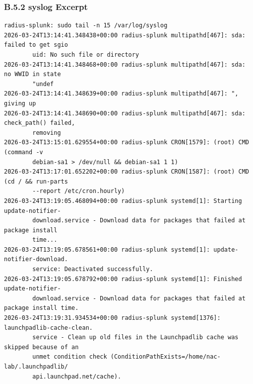 \documentclass[11pt]{article}
\begin{document}

\subsubsection{B.5.2 syslog Excerpt}
\label{sec:appendix-b-syslog-excerpt}

\begin{verbatim}
radius-splunk: sudo tail -n 15 /var/log/syslog
2026-03-24T13:14:41.348438+00:00 radius-splunk multipathd[467]: sda: failed to get sgio 
        uid: No such file or directory
2026-03-24T13:14:41.348468+00:00 radius-splunk multipathd[467]: sda: no WWID in state 
        "undef
2026-03-24T13:14:41.348639+00:00 radius-splunk multipathd[467]: ", giving up
2026-03-24T13:14:41.348690+00:00 radius-splunk multipathd[467]: sda: check_path() failed, 
        removing
2026-03-24T13:15:01.629554+00:00 radius-splunk CRON[1579]: (root) CMD (command -v 
        debian-sa1 > /dev/null && debian-sa1 1 1)
2026-03-24T13:17:01.652202+00:00 radius-splunk CRON[1587]: (root) CMD (cd / && run-parts 
        --report /etc/cron.hourly)
2026-03-24T13:19:05.468094+00:00 radius-splunk systemd[1]: Starting update-notifier-
        download.service - Download data for packages that failed at package install 
        time...
2026-03-24T13:19:05.678561+00:00 radius-splunk systemd[1]: update-notifier-download.
        service: Deactivated successfully.
2026-03-24T13:19:05.678792+00:00 radius-splunk systemd[1]: Finished update-notifier-
        download.service - Download data for packages that failed at package install time.
2026-03-24T13:19:31.934534+00:00 radius-splunk systemd[1376]: launchpadlib-cache-clean.
        service - Clean up old files in the Launchpadlib cache was skipped because of an
        unmet condition check (ConditionPathExists=/home/nac-lab/.launchpadlib/
        api.launchpad.net/cache).
\end{verbatim}

\end{document}
